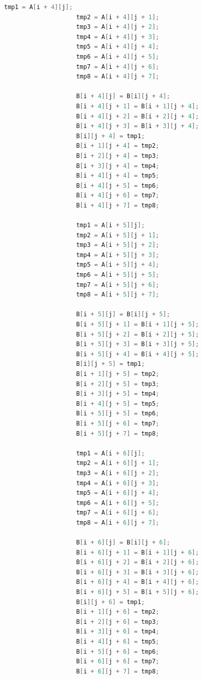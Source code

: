 \documentclass{article}
\begin{document}
\begin{lstlisting}[language=c++, caption={trans.c}, label={cd:2}]
                    tmp1 = A[i + 4][j];
                    tmp2 = A[i + 4][j + 1];
                    tmp3 = A[i + 4][j + 2];
                    tmp4 = A[i + 4][j + 3];
                    tmp5 = A[i + 4][j + 4];
                    tmp6 = A[i + 4][j + 5];
                    tmp7 = A[i + 4][j + 6];
                    tmp8 = A[i + 4][j + 7];

                    B[i + 4][j] = B[i][j + 4];
                    B[i + 4][j + 1] = B[i + 1][j + 4];
                    B[i + 4][j + 2] = B[i + 2][j + 4];
                    B[i + 4][j + 3] = B[i + 3][j + 4];
                    B[i][j + 4] = tmp1;
                    B[i + 1][j + 4] = tmp2;
                    B[i + 2][j + 4] = tmp3;
                    B[i + 3][j + 4] = tmp4;
                    B[i + 4][j + 4] = tmp5;
                    B[i + 4][j + 5] = tmp6;
                    B[i + 4][j + 6] = tmp7;
                    B[i + 4][j + 7] = tmp8;

                    tmp1 = A[i + 5][j];
                    tmp2 = A[i + 5][j + 1];
                    tmp3 = A[i + 5][j + 2];
                    tmp4 = A[i + 5][j + 3];
                    tmp5 = A[i + 5][j + 4];
                    tmp6 = A[i + 5][j + 5];
                    tmp7 = A[i + 5][j + 6];
                    tmp8 = A[i + 5][j + 7];

                    B[i + 5][j] = B[i][j + 5];
                    B[i + 5][j + 1] = B[i + 1][j + 5];
                    B[i + 5][j + 2] = B[i + 2][j + 5];
                    B[i + 5][j + 3] = B[i + 3][j + 5];
                    B[i + 5][j + 4] = B[i + 4][j + 5];
                    B[i][j + 5] = tmp1;
                    B[i + 1][j + 5] = tmp2;
                    B[i + 2][j + 5] = tmp3;
                    B[i + 3][j + 5] = tmp4;
                    B[i + 4][j + 5] = tmp5;
                    B[i + 5][j + 5] = tmp6;
                    B[i + 5][j + 6] = tmp7;
                    B[i + 5][j + 7] = tmp8;

                    tmp1 = A[i + 6][j];
                    tmp2 = A[i + 6][j + 1];
                    tmp3 = A[i + 6][j + 2];
                    tmp4 = A[i + 6][j + 3];
                    tmp5 = A[i + 6][j + 4];
                    tmp6 = A[i + 6][j + 5];
                    tmp7 = A[i + 6][j + 6];
                    tmp8 = A[i + 6][j + 7];

                    B[i + 6][j] = B[i][j + 6];
                    B[i + 6][j + 1] = B[i + 1][j + 6];
                    B[i + 6][j + 2] = B[i + 2][j + 6];
                    B[i + 6][j + 3] = B[i + 3][j + 6];
                    B[i + 6][j + 4] = B[i + 4][j + 6];
                    B[i + 6][j + 5] = B[i + 5][j + 6];
                    B[i][j + 6] = tmp1;
                    B[i + 1][j + 6] = tmp2;
                    B[i + 2][j + 6] = tmp3;
                    B[i + 3][j + 6] = tmp4;
                    B[i + 4][j + 6] = tmp5;
                    B[i + 5][j + 6] = tmp6;
                    B[i + 6][j + 6] = tmp7;
                    B[i + 6][j + 7] = tmp8;


\end{lstlisting}
\end{document}
